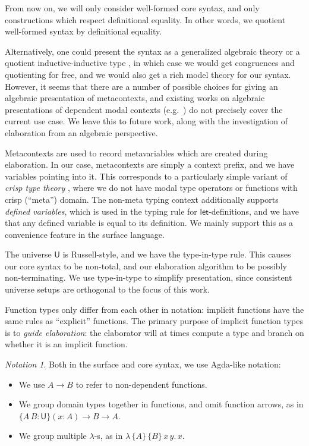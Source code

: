 \documentclass[acmsmall,review,anonymous,prologue,dvipsnames]{acmart}\settopmatter{printfolios=true,printccs=false,printacmref=false}
\newcommand{\slet}{\boldsymbol{\mathsf{let}}}
\renewcommand{\U}{\mathsf{U}}
\theoremstyle{remark}
\newtheorem{notation}{Notation}
\begin{document}
From now on, we will only consider well-formed core syntax, and only
constructions which respect definitional equality. In other words, we quotient
well-formed syntax by definitional equality.

Alternatively, one could present the syntax as a generalized algebraic theory
\cite{sterling2019algebraic} or a quotient inductive-inductive type
\cite{ttintt}, in which case we would get congruences and quotienting for free,
and we would also get a rich model theory for our syntax. However, it seems that
there are a number of possible choices for giving an algebraic presentation of
metacontexts, and existing works on algebraic presentations of dependent modal
contexts (e.g.\ \cite{birkedal2018modal}) do not precisely cover the current use
case. We leave this to future work, along with the investigation of elaboration
from an algebraic perspective.


Metacontexts are used to record metavariables which are created during
elaboration. In our case, metacontexts are simply a context prefix, and we have
variables pointing into it. This corresponds to a particularly simple variant of
\emph{crisp type theory} \cite{licata2018internal}, where we do not have modal
type operators or functions with crisp (``meta'') domain. The non-meta typing
context additionally supports \emph{defined variables}, which is used in the
typing rule for $\slet$-definitions, and we have that any defined variable is
equal to its definition. We mainly support this as a convenience feature in the
surface language.

The universe $\U$ is Russell-style, and we have the type-in-type rule.
This causes our core syntax to be non-total, and our elaboration algorithm to be
possibly non-terminating. We use type-in-type to simplify presentation, since
consistent universe setups are orthogonal to the focus of this work.

Function types only differ from each other in notation: implicit
functions have the same rules as ``explicit'' functions. The primary purpose of
implicit function types is to \emph{guide elaboration}: the elaborator will at
times compute a type and branch on whether it is an implicit function.

\begin{notation}
Both in the surface and core syntax, we use Agda-like notation:
\begin{itemize}
  \item We use $A \to B$ to refer to non-dependent functions.
  \item We group domain types together in functions, and omit function arrows,
    as in $\{A\,B : \U\}(x : A) \to B \to A$.
  \item We group multiple $\lambda$-s, as in $\lambda\,\{A\}\,\{B\}\,x\,y.\,x$.
\end{itemize}
\end{notation}
\end{document}
